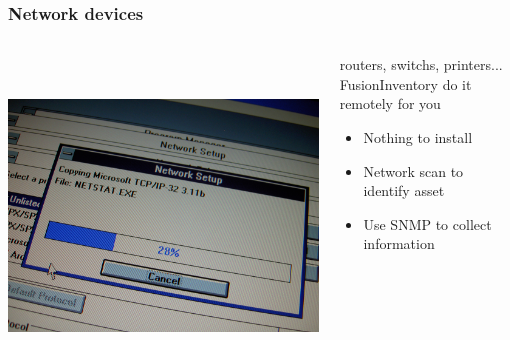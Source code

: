 \documentclass{beamer}
\begin{document}
\begin{frame}

    \frametitle{Network devices}


 \begin{columns}
 \begin{column}{0.15\textwidth}
         \includegraphics[height=8.5cm]{./pics/networking.jpg}
 \end{column}
 \begin{column}{1.25\textwidth}
    

    \begin{block}{routers, switchs, printers... \\
    FusionInventory do it remotely for you}
        \begin{itemize}
            \item Nothing to install
            \item Network scan to identify asset
            \item Use SNMP to collect information
        \end{itemize}
    \end{block}

 \end{column}
\end{columns}
\end{frame}
\end{document}
